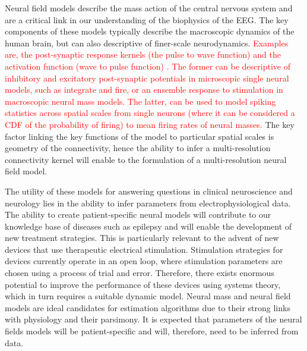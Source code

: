 \documentclass[review,authoryear,3p]{elsarticle}
\newcommand{\parham}[1]{\textcolor{red}{#1}}
\begin{document}
Neural field models describe the mass action of the central nervous system and are a critical link in our understanding of the biophysics of the EEG. The key components of these models typically describe the macroscopic dynamics of the human brain, but can also descriptive of finer-scale neurodynamics. \parham{Examples are, the post-synaptic response kernels (the pulse to wave function) and the activation function (wave to pulse function) \citep{Jirsa1997}. The former can be descriptive of inhibitory and excitatory post-synaptic potentials in microscopic single neural models, such as integrate and fire, or an ensemble response to stimulation in macroscopic neural mass models. The latter,  can be used to model spiking statistics across spatial scales from single neurons (where it can be considered a CDF of the probability of firing) to mean firing rates of neural masses.} The key factor linking the key functions of the model to particular spatial scales is geometry of the connectivity, hence the ability to infer a multi-resolution connectivity kernel will enable to the formulation of a multi-resolution neural field model. 

The utility of these models for answering questions in clinical neuroscience and neurology lies in the ability to infer parameters from electrophysiological data. The ability to create patient-specific neural models will contribute to our knowledge base of diseases such as epilepsy and will enable the development of new treatment strategies. This is particularly relevant to the advent of new devices that use therapeutic electrical stimulation. Stimulation strategies for devices currently operate in an open loop, where stimulation parameters are chosen using a process of trial and error. Therefore, there exists enormous potential to improve the performance of these devices using systems theory, which in turn requires a suitable dynamic model. Neural mass and neural field models are ideal candidates for estimation algorithms due to their strong links with physiology and their parsimony. It is expected that parameters of the neural fields models will be patient-specific and will, therefore, need to be inferred from data.
\end{document}
